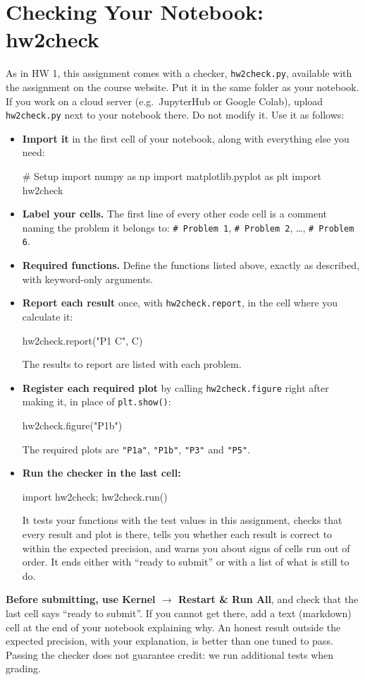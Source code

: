 \documentclass[12pt]{article}
\begin{document}
\section{Checking Your Notebook: hw2check}

\noindent
As in HW 1, this assignment comes with a checker, {\tt hw2check.py},
available with the assignment on the course website.  Put it in the
same folder as your notebook.  If you work on a cloud server
(e.g.\ JupyterHub or Google Colab), upload {\tt hw2check.py} next to
your notebook there.  Do not modify it.  Use it as follows:
\begin{itemize}
\item {\bf Import it} in the first cell of your notebook, along with everything else you need:
\begin{python}
# Setup
import numpy as np
import matplotlib.pyplot as plt
import hw2check
\end{python}
\item {\bf Label your cells.}  The first line of every other code cell is a comment naming the
  problem it belongs to: {\tt \# Problem 1}, {\tt \# Problem 2}, \ldots, {\tt \# Problem 6}.
\item {\bf Required functions.}  Define the functions listed above, exactly as described, with
  keyword-only arguments.
\item {\bf Report each result} once, with {\tt hw2check.report}, in the cell where you calculate it:
\begin{python}
hw2check.report("P1 C", C)
\end{python}
  The results to report are listed with each problem.
\item {\bf Register each required plot} by calling {\tt hw2check.figure} right after making it, in
  place of {\tt plt.show()}:
\begin{python}
hw2check.figure("P1b")
\end{python}
  The required plots are {\tt "P1a"}, {\tt "P1b"}, {\tt "P3"} and {\tt "P5"}.
\item {\bf Run the checker in the last cell:}
\begin{python}
import hw2check; hw2check.run()
\end{python}
  It tests your functions with the test values in this assignment,
  checks that every result and plot is there, tells you whether each result is correct to within
  the expected precision, and warns you about signs of cells run out of order.  It ends either
  with ``ready to submit'' or with a list of what is still to do.
\end{itemize}
{\bf Before submitting, use Kernel $\rightarrow$ Restart \& Run All}, and check that the last cell
says ``ready to submit''.  If you cannot get there, add a text (markdown) cell at the end of your
notebook explaining why.  An honest result outside the expected precision, with your explanation,
is better than one tuned to pass.  Passing the checker does not guarantee credit: we run
additional tests when grading.
\end{document}
